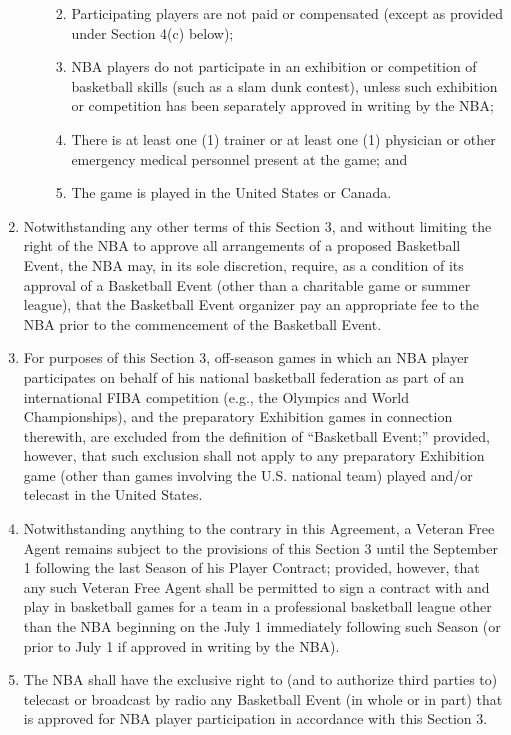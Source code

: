 \documentclass[
]{book}
\providecommand{\tightlist}{%
  \setlength{\itemsep}{0pt}\setlength{\parskip}{0pt}}
\begin{document}
\begin{enumerate}
\begin{enumerate}
    \begin{enumerate}
    \def\labelenumiii{(\roman{enumiii})}
    \tightlist
    \item
      Participating players are not paid or compensated (except as provided under Section 4(c) below);
    \item
      NBA players do not participate in an exhibition or competition of basketball skills (such as a slam dunk contest), unless such exhibition or competition has been separately approved in writing by the NBA;
    \item
      There is at least one (1) trainer or at least one (1) physician or other emergency medical personnel present at the game; and
    \item
      The game is played in the United States or Canada.
    \end{enumerate}
  \end{enumerate}
\item
  Notwithstanding any other terms of this Section 3, and without limiting the right of the NBA to approve all arrangements of a proposed Basketball Event, the NBA may, in its sole discretion, require, as a condition of its approval of a Basketball Event (other than a charitable game or summer league), that the Basketball Event organizer pay an appropriate fee to the NBA prior to the commencement of the Basketball Event.
\item
  For purposes of this Section 3, off-season games in which an NBA player participates on behalf of his national basketball federation as part of an international FIBA competition (e.g., the Olympics and World Championships), and the preparatory Exhibition games in connection therewith, are excluded from the definition of ``Basketball Event;'' provided, however, that such exclusion shall not apply to any preparatory Exhibition game (other than games involving the U.S. national team) played and/or telecast in the United States.
\item
  Notwithstanding anything to the contrary in this Agreement, a Veteran Free Agent remains subject to the provisions of this Section 3 until the September 1 following the last Season of his Player Contract; provided, however, that any such Veteran Free Agent shall be permitted to sign a contract with and play in basketball games for a team in a professional basketball league other than the NBA beginning on the July 1 immediately following such Season (or prior to July 1 if approved in writing by the NBA).
\item
  The NBA shall have the exclusive right to (and to authorize third parties to) telecast or broadcast by radio any Basketball Event (in whole or in part) that is approved for NBA player participation in accordance with this Section 3.
\end{enumerate}
\end{document}
